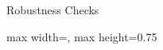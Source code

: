 \begin{frame}{Robustness Checks}
\begin{adjustbox}{max width=\textwidth, max height=0.75\textheight}
% 
\end{adjustbox}
\end{frame}
